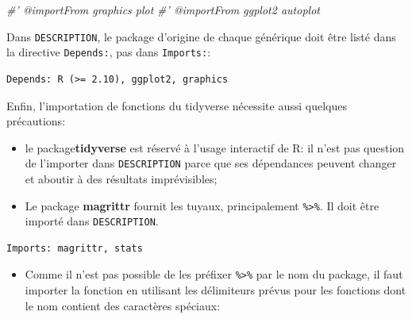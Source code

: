\documentclass[
  12pt,
  french,
  a4paper,
  extrafontsizes,onecolumn,openright
  ]{memoir}
\newenvironment{Shaded}{\begin{snugshade}}{\end{snugshade}}
\newcommand{\CommentTok}[1]{\textcolor[rgb]{0.56,0.35,0.01}{\textit{#1}}}
\providecommand{\tightlist}{%
  \setlength{\itemsep}{0pt}\setlength{\parskip}{0pt}}
\begin{document}
\scriptsize

\begin{Shaded}
\begin{Highlighting}[]
\CommentTok{#' @importFrom graphics plot}
\CommentTok{#' @importFrom ggplot2 autoplot}
\end{Highlighting}
\end{Shaded}

\normalsize

Dans \texttt{DESCRIPTION}, le package d'origine de chaque générique doit être listé dans la directive \texttt{Depends:}, pas dans \texttt{Imports:}:

\begin{verbatim}
Depends: R (>= 2.10), ggplot2, graphics
\end{verbatim}

Enfin, l'importation de fonctions du tidyverse nécessite aussi quelques précautions:

\begin{itemize}
\tightlist
\item
  le package\textbf{tidyverse} est réservé à l'usage interactif de R: il n'est pas question de l'importer dans \texttt{DESCRIPTION} parce que ses dépendances peuvent changer et aboutir à des résultats imprévisibles;
\item
  Le package \textbf{magrittr} fournit les tuyaux, principalement \texttt{\%\textgreater{}\%}.
  Il doit être importé dans \texttt{DESCRIPTION}.
\end{itemize}

\begin{verbatim}
Imports: magrittr, stats
\end{verbatim}

\begin{itemize}
\tightlist
\item
  Comme il n'est pas possible de les préfixer \texttt{\%\textgreater{}\%} par le nom du package, il faut importer la fonction en utilisant les délimiteurs prévus pour les fonctions dont le nom contient des caractères spéciaux:
\end{itemize}

\scriptsize

\begin{Shaded}
\end{Shaded}

\normalsize
\end{document}
